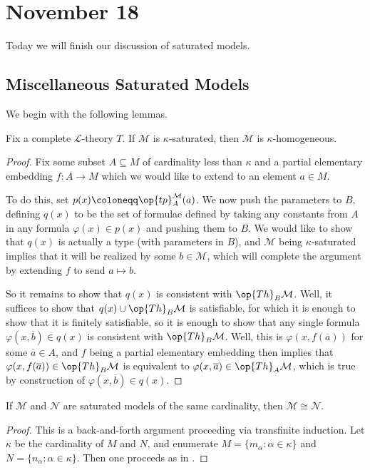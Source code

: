 \documentclass[../notes.tex]{subfiles}
\begin{document}
\section{November 18}

Today we will finish our discussion of saturated models.

\subsection{Miscellaneous Saturated Models}
We begin with the following lemmas.
\begin{lemma}
	Fix a complete $\mathcal L$-theory $T$. If $\mathcal M$ is $\kappa$-saturated, then $\mathcal M$ is $\kappa$-homogeneous.
\end{lemma}
\begin{proof}
	Fix some subset $A\subseteq M$ of cardinality less than $\kappa$ and a partial elementary embedding $f\colon A\to M$ which we would like to extend to an element $a\in M$.

	To do this, set $p(x)\coloneqq\op{tp}^\mathcal M_A(a)$. We now push the parameters to $B$, defining $q(x)$ to be the set of formulae defined by taking any constants from $A$ in any formula $\varphi(x)\in p(x)$ and pushing them to $B$. We would like to show that $q(x)$ is actually a type (with parameters in $B$), and $\mathcal M$ being $\kappa$-saturated implies that it will be realized by some $b\in\mathcal M$, which will complete the argument by extending $f$ to send $a\mapsto b$.

	So it remains to show that $q(x)$ is consistent with $\op{Th}_B\mathcal M$. Well, it suffices to show that $q(x)\cup\op{Th}_B\mathcal M$ is satisfiable, for which it is enough to show that it is finitely satisfiable, so it is enough to show that any single formula $\varphi(x,\overline b)\in q(x)$ is consistent with $\op{Th}_B\mathcal M$. Well, this is $\varphi(x,f(\overline a))$ for some $\overline a\in A$, and $f$ being a partial elementary embedding then implies that $\varphi(x,f(\overline a))\in\op{Th}_B\mathcal M$ is equivalent to $\varphi(x,\overline a)\in\op{Th}_A\mathcal M$, which is true by construction of $\varphi(x,\overline b)\in q(x)$.
\end{proof}
\begin{lemma} \label{lem:saturated-is-uniq}
	If $\mathcal M$ and $\mathcal N$ are saturated models of the same cardinality, then $\mathcal M\cong\mathcal N$.
\end{lemma}
\begin{proof}
	This is a back-and-forth argument proceeding via transfinite induction. Let $\kappa$ be the cardinality of $M$ and $N$, and enumerate $M=\{m_\alpha:\alpha\in\kappa\}$ and $N=\{n_\alpha:\alpha\in\kappa\}$. Then one proceeds as in .
\end{proof}
\end{document}
